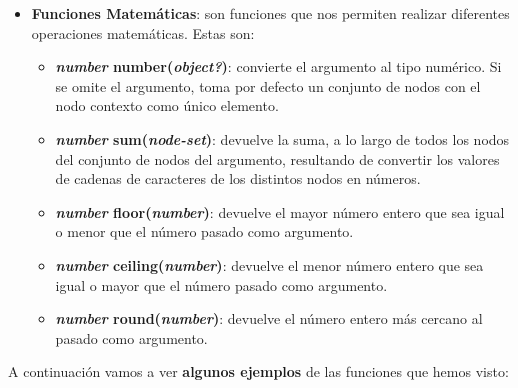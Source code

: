 \begin{itemize}
    \item \textbf{Funciones Matemáticas}: son funciones que nos permiten realizar diferentes operaciones matemáticas. Estas son:
    \begin{itemize}
        \item \textbf{\textit{number} number(\textit{object?})}: convierte el argumento al tipo numérico. Si se omite el argumento, toma por defecto un conjunto de nodos con el nodo contexto como único elemento.
        \item \textbf{\textit{number} sum(\textit{node-set})}: devuelve la suma, a lo largo de todos los nodos del conjunto de nodos del argumento, resultando de convertir los valores de cadenas de caracteres de los distintos nodos en números.
        \item \textbf{\textit{number} floor(\textit{number})}: devuelve el mayor número entero que sea igual o menor que el número pasado como argumento.
        \item \textbf{\textit{number} ceiling(\textit{number})}: devuelve el menor número entero que sea igual o mayor que el número pasado como argumento.
        \item \textbf{\textit{number} round(\textit{number})}: devuelve el número entero más cercano al pasado como argumento.
    \end{itemize}
\end{itemize}

A continuación vamos a ver \textbf{algunos ejemplos} de las funciones que hemos visto:

